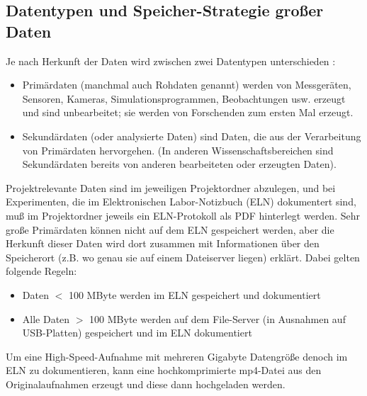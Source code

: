 \subsection{Datentypen und Speicher-Strategie großer Daten}
Je nach Herkunft der Daten wird zwischen zwei Datentypen unterschieden \cite{gitelman2013}:
\begin{itemize}
  \item Primärdaten (manchmal auch Rohdaten genannt) werden von Messgeräten,
        Sensoren, Kameras, Simulationsprogrammen, Beobachtungen usw. erzeugt
        und sind unbearbeitet; sie werden von Forschenden zum ersten Mal erzeugt.
  \item Sekundärdaten (oder analysierte Daten) sind Daten, die aus der
        Verarbeitung von Primärdaten hervorgehen. (In anderen
        Wissenschaftsbereichen sind Sekundärdaten bereits von anderen
        bearbeiteten oder erzeugten Daten).
\end{itemize}
Projektrelevante Daten sind im jeweiligen Projektordner abzulegen, und bei Experimenten, die im Elektronischen Labor-Notizbuch (ELN) dokumentert sind, muß im Projektordner jeweils ein ELN-Protokoll als PDF hinterlegt werden.
Sehr große Primärdaten können nicht auf dem ELN gespeichert werden, aber die Herkunft dieser Daten wird dort zusammen mit Informationen über den Speicherort (z.B. wo genau sie auf einem Dateiserver liegen) erklärt. Dabei gelten folgende Regeln:
\begin{itemize}
  \item Daten $<$ 100 MByte werden im ELN gespeichert und dokumentiert
  \item Alle Daten $>$ 100 MByte werden auf dem File-Server (in Ausnahmen auf USB-Platten) gespeichert und im
        ELN dokumentiert
\end{itemize}
Um eine High-Speed-Aufnahme mit mehreren Gigabyte Datengröße denoch im ELN zu dokumentieren, kann eine hochkomprimierte mp4-Datei aus den Originalaufnahmen erzeugt und diese dann hochgeladen werden.

